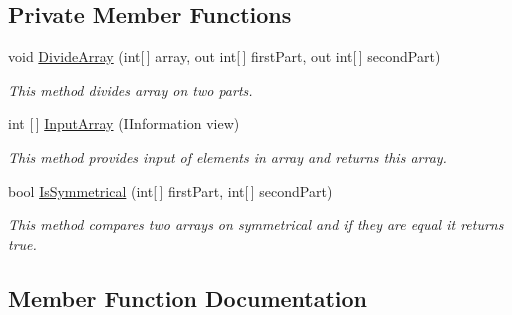 \subsection*{Private Member Functions}
\begin{DoxyCompactItemize}
\item 
void \mbox{\hyperlink{class_home_work_1_1_task_library_1_1_tasks_1_1_lesson4_1_1_task3_aff6672d45834e44c1f31044599584750}{Divide\+Array}} (int\mbox{[}$\,$\mbox{]} array, out int\mbox{[}$\,$\mbox{]} first\+Part, out int\mbox{[}$\,$\mbox{]} second\+Part)
\begin{DoxyCompactList}\small\item\em This method divides array on two parts. \end{DoxyCompactList}\item 
int \mbox{[}$\,$\mbox{]} \mbox{\hyperlink{class_home_work_1_1_task_library_1_1_tasks_1_1_lesson4_1_1_task3_a5f680c4015903452f58ab7b3a2fc0e54}{Input\+Array}} (I\+Information view)
\begin{DoxyCompactList}\small\item\em This method provides input of elements in array and returns this array. \end{DoxyCompactList}\item 
bool \mbox{\hyperlink{class_home_work_1_1_task_library_1_1_tasks_1_1_lesson4_1_1_task3_a24a7e15b38e01f3223697ec1351c0db4}{Is\+Symmetrical}} (int\mbox{[}$\,$\mbox{]} first\+Part, int\mbox{[}$\,$\mbox{]} second\+Part)
\begin{DoxyCompactList}\small\item\em This method compares two arrays on symmetrical and if they are equal it returns true. \end{DoxyCompactList}\end{DoxyCompactItemize}


\subsection{Member Function Documentation}
\mbox{\label{class_home_work_1_1_task_library_1_1_tasks_1_1_lesson4_1_1_task3_aff6672d45834e44c1f31044599584750}} 
